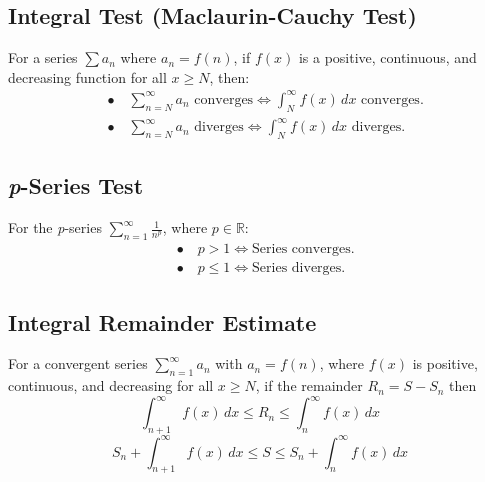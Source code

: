 \documentclass[a4paper,11pt]{article}
\begin{document}


\subsection{Integral Test (Maclaurin-Cauchy Test)}

\begin{tcolorbox}
    For a series $\textstyle \sum a_n$ where $a_n = f(n)$, if $f(x)$ is a positive, continuous, and decreasing function for all $x \geq N$, then:
    \[
    \begin{aligned}
        &\bullet \quad \sum_{n=N}^{\infty} a_n \text{ converges} \iff \int_{N}^{\infty} f(x) \, dx \text{ converges}. \\[8pt]  
        &\bullet \quad \sum_{n=N}^{\infty} a_n \text{ diverges} \iff \int_{N}^{\infty} f(x) \, dx \text{ diverges}.
    \end{aligned}
    \]
\end{tcolorbox}



\subsection{\emph{p}-Series Test}

\begin{tcolorbox}
    For the \emph{p}-series $\sum_{n=1}^{\infty} \frac{1}{n^p}$, where $p \in \mathbb{R}$:
    \[
    \begin{aligned}
        &\bullet \quad p > 1 \iff \text{Series converges}. \\[8pt]  
        &\bullet \quad p \leq 1 \iff  \text{Series diverges}.
    \end{aligned}
    \]
\end{tcolorbox}




\subsection{Integral Remainder Estimate}

\begin{tcolorbox}
    For a convergent series $\textstyle \sum_{n=1}^{\infty} a_n$ with $a_n = f(n)$, where $f(x)$ is positive, continuous, and decreasing for all $x \geq N$, if the remainder $R_n = S - S_n$ then
    \[
    \int_{n+1}^{\infty} f(x) \, dx \leq R_n \leq \int_n^{\infty} f(x) \, dx
    \]
    \[
    S_n + \int_{n+1}^{\infty} f(x) \, dx  \leq S \leq S_n + \int_n^{\infty} f(x) \, dx
    \]
\end{tcolorbox}
\end{document}
